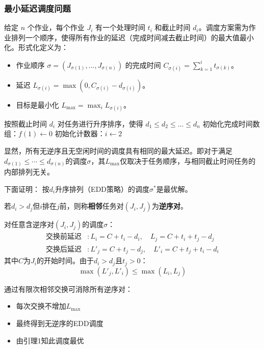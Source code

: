\documentclass[./../main.tex]{subfiles}
\begin{document}
\subsubsection{最小延迟调度问题}

给定 $n$ 个作业，每个作业 $J_i$ 有一个处理时间 $t_i$ 和截止时间 $d_i$。调度方案需为作业排列一个顺序，使得所有作业的延迟（完成时间减去截止时间）的最大值最小化。形式化定义为：
\begin{itemize}
    \item 作业顺序 $\sigma = (J_{\sigma(1)}, \dots, J_{\sigma(n)})$ 的完成时间 $C_{\sigma(i)} = \sum_{k=1}^i t_{\sigma(k)}$。
    \item 延迟 $L_{\sigma(i)} = \max(0, C_{\sigma(i)} - d_{\sigma(i)})$。
    \item 目标是最小化 $L_{\max} = \max_{i} L_{\sigma(i)}$。
\end{itemize}

\begin{algorithm}[H]
\caption{最小延迟调度算法}
\SetAlgoLined
{}

\BlankLine
按照截止时间 $d_i$ 对任务进行升序排序，使得 $d_1 \leq d_2 \leq \dots \leq d_n$\;
初始化完成时间数组：$f(1) \gets 0$\;
初始化计数器：$i \gets 2$\;


\;
\end{algorithm}

显然，所有无逆序且无空闲时间的调度具有相同的最大延迟。即对于满足$d_{\sigma(1)} \leq \cdots \leq d_{\sigma(n)}$的调度$\sigma$，其$L_{\max}$仅取决于任务顺序，与相同截止时间任务的内部排列无关。

下面证明：
按$d_i$升序排列（EDD策略）的调度$\sigma^*$是最优解。

若$d_i > d_j$但$i$排在$j$前，则称\textbf{相邻}任务对$(J_i,J_j)$为\textbf{逆序对}。

对任意含逆序对$(J_i,J_j)$的调度$\sigma$：
\begin{align*}
\text{交换前延迟} & : L_i = C + t_i - d_i, \quad L_j = C + t_i + t_j - d_j \\
\text{交换后延迟} & : L'_j = C + t_j - d_j, \quad L'_i = C + t_j + t_i - d_i
\end{align*}
其中$C$为$J_i$的开始时间。由于$d_i > d_j$且$t_j > 0$：
$$ \max(L'_j, L'_i) \leq \max(L_i, L_j) $$

通过有限次相邻交换可消除所有逆序对：
\begin{itemize}
    \item 每次交换不增加$L_{\max}$
    \item 最终得到无逆序的EDD调度
    \item 由引理1知此调度最优
\end{itemize}
\end{document}
